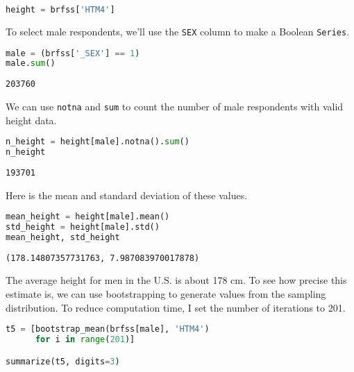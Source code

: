 \begin{lstlisting}[language=Python,style=source]
height = brfss['HTM4']
\end{lstlisting}

To select male respondents, we'll use the \passthrough{\lstinline!SEX!}
column to make a Boolean \passthrough{\lstinline!Series!}.

\begin{lstlisting}[language=Python,style=source]
male = (brfss['_SEX'] == 1)
male.sum()
\end{lstlisting}

\begin{lstlisting}[style=output]
203760
\end{lstlisting}

We can use \passthrough{\lstinline!notna!} and
\passthrough{\lstinline!sum!} to count the number of male respondents
with valid height data.

\begin{lstlisting}[language=Python,style=source]
n_height = height[male].notna().sum()
n_height
\end{lstlisting}

\begin{lstlisting}[style=output]
193701
\end{lstlisting}

\pagebreak

Here is the mean and standard deviation of these values.

\begin{lstlisting}[language=Python,style=source]
mean_height = height[male].mean()
std_height = height[male].std()
mean_height, std_height
\end{lstlisting}

\begin{lstlisting}[style=output]
(178.14807357731763, 7.987083970017878)
\end{lstlisting}

The average height for men in the U.S. is about 178 cm. To see how
precise this estimate is, we can use bootstrapping to generate values
from the sampling distribution. To reduce computation time, I set the
number of iterations to 201.

\begin{lstlisting}[language=Python,style=source]
t5 = [bootstrap_mean(brfss[male], 'HTM4')
      for i in range(201)]

summarize(t5, digits=3)
\end{lstlisting}

